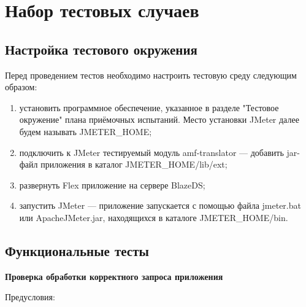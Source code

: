 \section{Набор тестовых случаев}

\subsection{Настройка тестового окружения}

Перед проведением тестов необходимо настроить тестовую среду следующим образом:

\begin{enumerate}
\item установить программное обеспечение, указанное в разделе "Тестовое окружение" плана приёмочных испытаний.
Место установки JMeter далее будем называть JMETER\_HOME;
\item подключить к JMeter тестируемый модуль amf-translator --- добавить jar-файл приложения в каталог
JMETER\_HOME/lib/ext;
\item развернуть Flex приложение на сервере BlazeDS;
\item запустить JMeter --- приложение запускается с помощью файла jmeter.bat или ApacheJMeter.jar, находящихся в
каталоге JMETER\_HOME/bin.
\end{enumerate}

\subsection{Функциональные тесты}

{\bfseries Проверка обработки корректного запроса приложения}

Предусловия:


